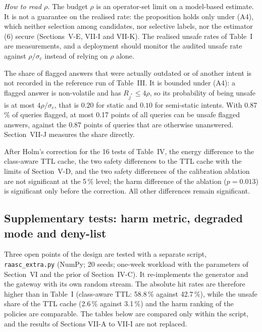 \emph{How to read $\rho$.} The budget $\rho$ is an operator-set limit on a model-based estimate. It is not a guarantee on the realised rate: the proposition holds only under (A4), which neither selection among candidates, nor selective labels, nor the estimator (6) secure (Sections~V-E, VII-I and VII-K). The realised unsafe rates of Table~I are measurements, and a deployment should monitor the audited unsafe rate against $\rho/\sigma_c$ instead of relying on $\rho$ alone.

The share of flagged answers that were actually outdated or of another intent is not recorded in the reference run of Table~III. It is bounded under (A4): a flagged answer is non-volatile and has $R_{j^*}\le4\rho$, so its probability of being unsafe is at most $4\rho/\sigma_c$, that is $0.20$ for static and $0.10$ for semi-static intents. With 0.87\,\% of queries flagged, at most 0.17 points of all queries can be unsafe flagged answers, against the 0.87 points of queries that are otherwise unanswered. Section~VII-J measures the share directly.

After Holm's correction for the 16 tests of Table~IV, the energy difference to the class-aware TTL cache, the two safety differences to the TTL cache with the limits of Section~V-D, and the two safety differences of the calibration ablation are not significant at the 5\,\% level; the harm difference of the ablation ($p=0.013$) is significant only before the correction. All other differences remain significant.

\subsection{Supplementary tests: harm metric, degraded mode and deny-list}
Three open points of the design are tested with a separate script, \texttt{raasc\_extra.py} (NumPy; 20 seeds; one-week workload with the parameters of Section~VI and the prior of Section~IV-C). It re-implements the generator and the gateway with its own random stream. The absolute hit rates are therefore higher than in Table~I (class-aware TTL: 58.8\,\% against 42.7\,\%), while the unsafe share of the TTL cache (2.6\,\% against 3.1\,\%) and the harm ranking of the policies are comparable. The tables below are compared only within the script, and the results of Sections VII-A to VII-I are not replaced.

